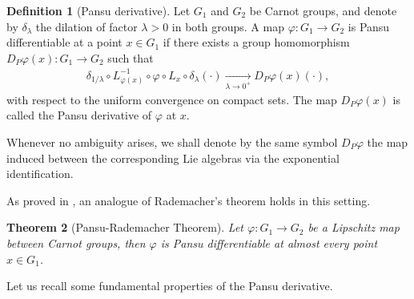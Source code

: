 \documentclass[dvipsnames]{amsart}
\newtheorem{theorem}{Theorem}[section]
\theoremstyle{definition}
\newtheorem{definition}[theorem]{Definition}
\theoremstyle{definition}
\numberwithin{equation}{section}
\begin{document}
\begin{definition}[Pansu derivative]\label{def: P deriv}
    Let $G_1$ and $G_2$ be Carnot groups, and denote by $\delta_{\lambda}$ the dilation of factor $\lambda>0$ in both groups. A map $\varphi:G_1 \rightarrow G_2$ is Pansu differentiable at a point $x \in G_1$ if there exists a group homomorphism $D_P\varphi(x): G_1 \rightarrow G_2$ such that 
    \begin{align}\label{Pansu derivative}
         \delta_{1/\lambda} \circ L^{-1}_{\varphi(x)} \circ \varphi \circ L_x \circ \delta_{\lambda}(\cdot) \xrightarrow[\lambda \rightarrow 0^+]{}   D_P\varphi(x)(\cdot),
    \end{align}
 with respect to the uniform convergence on compact sets.
    The map $D_P\varphi(x)$ is called the Pansu derivative of $\varphi$ at $x$.

    Whenever no ambiguity arises, we shall denote by the same symbol $D_P\varphi$ the map induced between the corresponding Lie algebras via the exponential identification.
    \end{definition}



As proved in \cite{Pansu-quasiconformal}, an analogue of Rademacher's theorem holds in this setting.

\begin{theorem}[Pansu-Rademacher Theorem]
    Let $\varphi : G_1 \rightarrow G_2$ be a Lipschitz map between Carnot groups, then $\varphi$ is Pansu differentiable at almost every point $x \in G_1$.
\end{theorem}


Let us recall some fundamental properties of the Pansu derivative.
\end{document}
